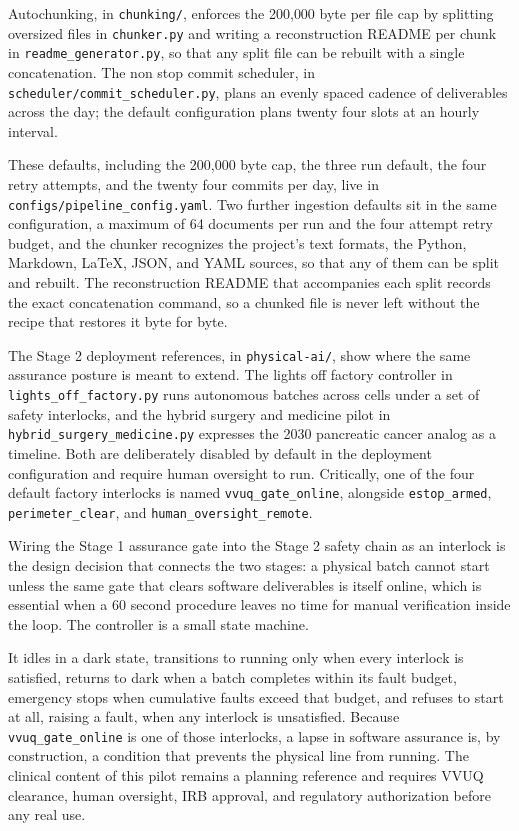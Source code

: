 Autochunking, in
\texttt{chunking/}, enforces the 200{,}000 byte per file cap by splitting
oversized files in \texttt{chunker.py} and writing a reconstruction README per
chunk in \texttt{readme\_generator.py}, so that any split file can be rebuilt with
a single concatenation. The non stop commit scheduler, in
\texttt{scheduler/commit\_scheduler.py}, plans an evenly spaced cadence of
deliverables across the day; the default configuration plans twenty four slots at
an hourly interval. 

These defaults, including the 200{,}000 byte cap, the three
run default, the four retry attempts, and the twenty four commits per day, live
in \texttt{configs/pipeline\_config.yaml}. Two further ingestion defaults sit in
the same configuration, a maximum of 64 documents per run and the four attempt
retry budget, and the chunker recognizes the project's text formats, the Python,
Markdown, LaTeX, JSON, and YAML sources, so that any of them can be split and
rebuilt. The reconstruction README that accompanies each split records the exact
concatenation command, so a chunked file is never left without the recipe that
restores it byte for byte.

The Stage 2 deployment references, in \texttt{physical-ai/}, show where the same
assurance posture is meant to extend. The lights off factory controller in
\texttt{lights\_off\_factory.py} runs autonomous batches across cells under a set
of safety interlocks, and the hybrid surgery and medicine pilot in
\texttt{hybrid\_surgery\_medicine.py} expresses the 2030 pancreatic cancer analog
as a timeline. Both are deliberately disabled by default in the deployment
configuration and require human oversight to run. Critically, one of the four
default factory interlocks is named \texttt{vvuq\_gate\_online}, alongside
\texttt{estop\_armed}, \texttt{perimeter\_clear}, and
\texttt{human\_oversight\_remote}. 

Wiring the Stage 1 assurance gate into the
Stage 2 safety chain as an interlock is the design decision that connects the two
stages: a physical batch cannot start unless the same gate that clears software
deliverables is itself online, which is essential when a 60 second procedure
leaves no time for manual verification inside the loop. The controller is a small
state machine. 

It idles in a dark state, transitions to running only when every
interlock is satisfied, returns to dark when a batch completes within its fault
budget, emergency stops when cumulative faults exceed that budget, and refuses to
start at all, raising a fault, when any interlock is unsatisfied. Because
\texttt{vvuq\_gate\_online} is one of those interlocks, a lapse in software
assurance is, by construction, a condition that prevents the physical line from
running. The clinical content of this pilot remains a planning reference and requires VVUQ clearance, human
oversight, IRB approval, and regulatory authorization before any real use.

